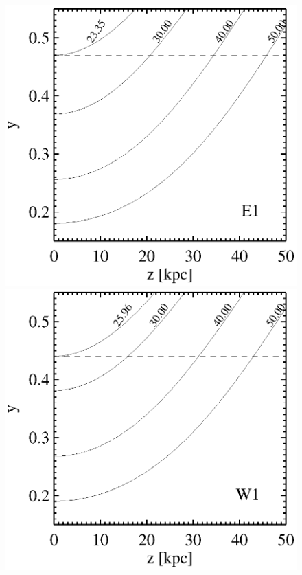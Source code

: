 \begin{figure}
  \begin{center}
    \begin{minipage}{0.495\linewidth}
      \includegraphics*[width=\textwidth, trim=25mm 0mm 40mm 10mm, clip]{edec.eps}
    \end{minipage}
    \begin{minipage}{0.495\linewidth}
      \includegraphics*[width=\textwidth, trim=25mm 0mm 40mm 10mm, clip]{wdec.eps}

\end{minipage}
\end{center}
\end{figure}
